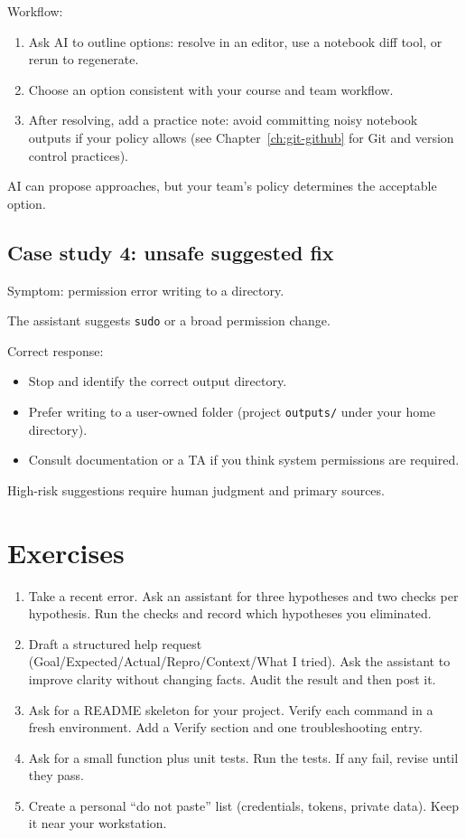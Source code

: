 Workflow:
\begin{enumerate}[noitemsep]
  \item Ask AI to outline options: resolve in an editor, use a notebook diff tool, or rerun to regenerate.
  \item Choose an option consistent with your course and team workflow.
  \item After resolving, add a practice note: avoid committing noisy notebook outputs if your policy allows (see Chapter~\ref{ch:git-github} for Git and version control practices).
\end{enumerate}

AI can propose approaches, but your team's policy determines the acceptable option.

\subsection{Case study 4: unsafe suggested fix}
Symptom: permission error writing to a directory.

The assistant suggests \texttt{sudo} or a broad permission change.

Correct response:
\begin{itemize}[noitemsep]
  \item Stop and identify the correct output directory.
  \item Prefer writing to a user-owned folder (project \texttt{outputs/} under your home directory).
  \item Consult documentation or a TA if you think system permissions are required.
\end{itemize}

High-risk suggestions require human judgment and primary sources.

\section{Exercises}
\begin{enumerate}[noitemsep]
  \item Take a recent error. Ask an assistant for three hypotheses and two checks per hypothesis. Run the checks and record which hypotheses you eliminated.
  \item Draft a structured help request (Goal/Expected/Actual/Repro/Context/What I tried). Ask the assistant to improve clarity without changing facts. Audit the result and then post it.
  \item Ask for a README skeleton for your project. Verify each command in a fresh environment. Add a Verify section and one troubleshooting entry.
  \item Ask for a small function plus unit tests. Run the tests. If any fail, revise until they pass.
  \item Create a personal ``do not paste'' list (credentials, tokens, private data). Keep it near your workstation.
\end{enumerate}

